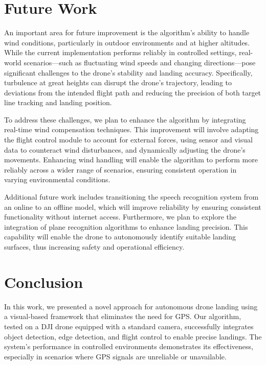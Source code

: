 \documentclass[3p,times]{elsarticle}
\begin{document}




\newpage \section{Future Work} \label{sec:future}
An important area for future improvement is the algorithm's ability to handle wind conditions, particularly in outdoor environments and at higher altitudes. While the current implementation performs reliably in controlled settings, real-world scenarios—such as fluctuating wind speeds and changing directions—pose significant challenges to the drone's stability and landing accuracy. Specifically, turbulence at great heights can disrupt the drone's trajectory, leading to deviations from the intended flight path and reducing the precision of both target line tracking and landing position.

To address these challenges, we plan to enhance the algorithm by integrating real-time wind compensation techniques. This improvement will involve adapting the flight control module to account for external forces, using sensor and visual data to counteract wind disturbances, and dynamically adjusting the drone's movements. Enhancing wind handling will enable the algorithm to perform more reliably across a wider range of scenarios, ensuring consistent operation in varying environmental conditions.

Additional future work includes transitioning the speech recognition system from an online to an offline model, which will improve reliability by ensuring consistent functionality without internet access. Furthermore, we plan to explore the integration of plane recognition algorithms to enhance landing precision. This capability will enable the drone to autonomously identify suitable landing surfaces, thus increasing safety and operational efficiency.

\section{Conclusion}
In this work, we presented a novel approach for autonomous drone landing using a visual-based framework that eliminates the need for GPS. Our algorithm, tested on a DJI drone equipped with a standard camera, successfully integrates object detection, edge detection, and flight control to enable precise landings. The system's performance in controlled environments demonstrates its effectiveness, especially in scenarios where GPS signals are unreliable or unavailable.\\
\end{document}
